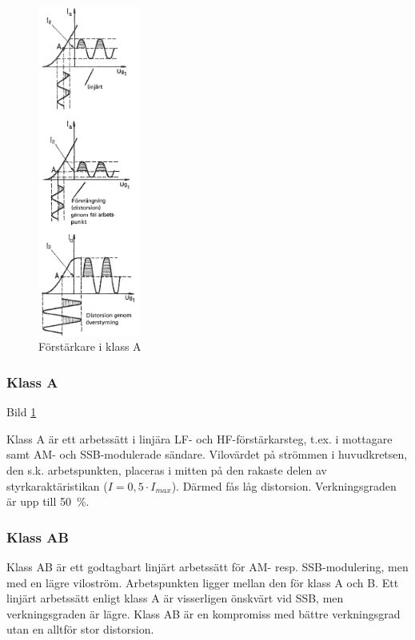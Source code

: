 \begin{figure}
\includegraphics[width=0.3\textwidth]{images/cropped_pdfs/bild_2_3-44.pdf}
\caption{Förstärkare i klass A}
\label{fig:BildII3-44}
\end{figure}

\subsubsection{Klass A}

Bild \ref{fig:BildII3-44}

Klass A är ett arbetssätt i linjära LF- och HF-förstärkarsteg, t.ex. i
mottagare samt AM- och SSB-modulerade sändare. Vilovärdet på strömmen
i huvudkretsen, den s.k. arbetspunkten, placeras i mitten på den
rakaste delen av styrkaraktäristikan (\(I=0,5\cdot I_{max}\)).  Därmed
fås låg distorsion. Verkningsgraden är upp till 50~\%.

\subsubsection{Klass AB}

Klass AB är ett godtagbart linjärt arbetssätt för AM-
resp. SSB-modulering, men med en lägre viloström. Arbetspunkten ligger
mellan den för klass A och B. Ett linjärt arbetssätt enligt klass A är
visserligen önskvärt vid SSB, men verkningsgraden är lägre. Klass AB
är en kompromiss med bättre verkningsgrad utan en alltför stor
distorsion.

